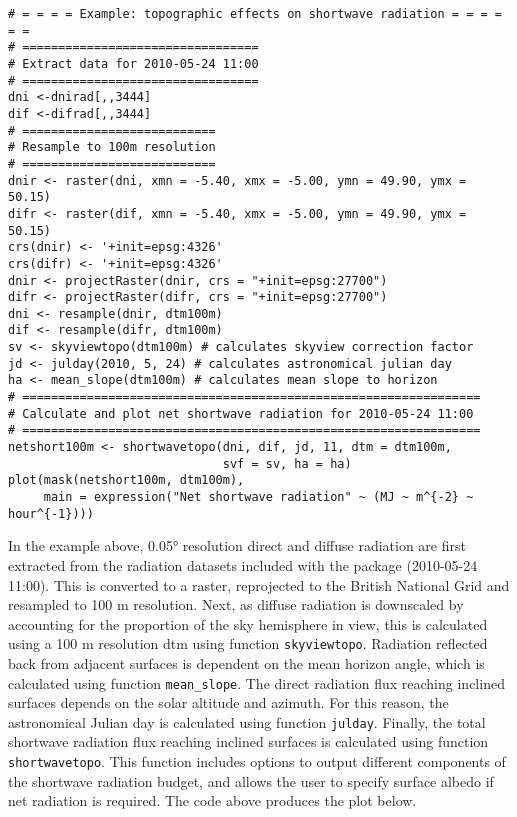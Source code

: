 \documentclass[]{article}
\begin{document}
\begin{verbatim}
# = = = = Example: topographic effects on shortwave radiation = = = = = = 
# =================================
# Extract data for 2010-05-24 11:00
# =================================
dni <-dnirad[,,3444]
dif <-difrad[,,3444]
# ===========================
# Resample to 100m resolution
# ===========================
dnir <- raster(dni, xmn = -5.40, xmx = -5.00, ymn = 49.90, ymx = 50.15)
difr <- raster(dif, xmn = -5.40, xmx = -5.00, ymn = 49.90, ymx = 50.15)
crs(dnir) <- '+init=epsg:4326'
crs(difr) <- '+init=epsg:4326'
dnir <- projectRaster(dnir, crs = "+init=epsg:27700")
difr <- projectRaster(difr, crs = "+init=epsg:27700")
dni <- resample(dnir, dtm100m)
dif <- resample(difr, dtm100m)
sv <- skyviewtopo(dtm100m) # calculates skyview correction factor  
jd <- julday(2010, 5, 24) # calculates astronomical julian day
ha <- mean_slope(dtm100m) # calculates mean slope to horizon
# ================================================================
# Calculate and plot net shortwave radiation for 2010-05-24 11:00
# ================================================================
netshort100m <- shortwavetopo(dni, dif, jd, 11, dtm = dtm100m,
                              svf = sv, ha = ha)
plot(mask(netshort100m, dtm100m),
     main = expression("Net shortwave radiation" ~ (MJ ~ m^{-2} ~   hour^{-1})))
\end{verbatim}

In the example above, 0.05° resolution direct and diffuse radiation are
first extracted from the radiation datasets included with the package
(2010-05-24 11:00). This is converted to a raster, reprojected to the
British National Grid and resampled to 100 m resolution. Next, as
diffuse radiation is downscaled by accounting for the proportion of the
sky hemisphere in view, this is calculated using a 100 m resolution dtm
using function \texttt{skyviewtopo}. Radiation reflected back from
adjacent surfaces is dependent on the mean horizon angle, which is
calculated using function \texttt{mean\_slope}. The direct radiation
flux reaching inclined surfaces depends on the solar altitude and
azimuth. For this reason, the astronomical Julian day is calculated
using function \texttt{julday}. Finally, the total shortwave radiation
flux reaching inclined surfaces is calculated using function
\texttt{shortwavetopo}. This function includes options to output
different components of the shortwave radiation budget, and allows the
user to specify surface albedo if net radiation is required. The code
above produces the plot below.
\end{document}
